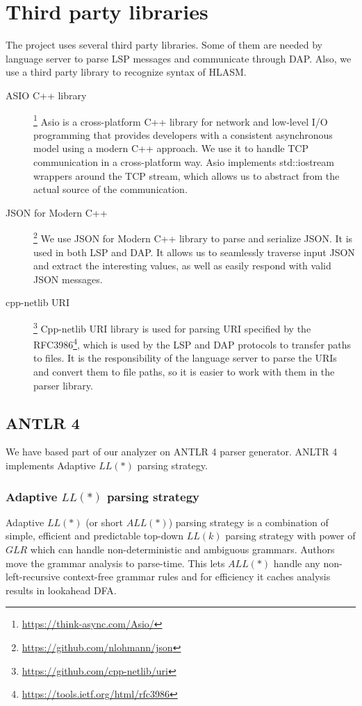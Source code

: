 \chapter{Third party libraries}
\label{3rd_party}
The project uses several third party libraries. Some of them are needed by language server to parse LSP messages and communicate through DAP. Also, we use a third party library to recognize syntax of HLASM.

\begin{description}
	\item [ASIO C++ library]\hspace{-4px}\footnote{\url{https://think-async.com/Asio/}}
	Asio is a cross-platform C++ library for network and low-level I/O programming that provides developers with a consistent asynchronous model using a modern C++ approach. We use it to handle TCP communication in a cross-platform way. Asio implements std::iostream wrappers around the TCP stream, which allows us to abstract from the actual source of the communication.
	
	\item [JSON for Modern C++]\hspace{-4px}\footnote{\url{https://github.com/nlohmann/json}} We use JSON for Modern C++ library to parse and serialize JSON. It is used in both LSP and DAP. It allows us to seamlessly traverse input JSON and extract the interesting values, as well as easily respond with valid JSON messages.
	
	\item [cpp-netlib URI]\hspace{-4px}\footnote{\url{https://github.com/cpp-netlib/uri}} Cpp-netlib URI library is used for parsing URI specified by the RFC3986\footnote{\url{https://tools.ietf.org/html/rfc3986}}, which is used by the LSP and DAP protocols to transfer paths to files. It is the responsibility of the language server to parse the URIs and convert them to file paths, so it is easier to work with them in the parser library. 
\end{description}

\section{ANTLR 4}
\label{antlr}
We have based part of our analyzer on ANTLR 4 parser generator. ANLTR 4 implements Adaptive $LL(*)$ \cite{parr2014adaptive} parsing strategy.

\subsection{Adaptive $LL(*)$ parsing strategy}
Adaptive $LL(*)$ (or short $ALL(*)$) parsing strategy is a combination of simple, efficient and predictable top-down $LL(k)$ parsing strategy with power of $GLR$ which can handle non-deterministic and ambiguous grammars. 
Authors move the grammar analysis to parse-time. This lets $ALL(*)$ handle any non-left-recursive context-free grammar rules and for efficiency it caches analysis results in lookahead DFA.

